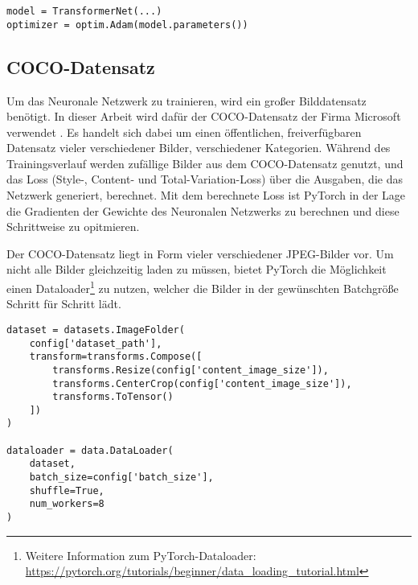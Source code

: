 \begin{listing}[ht]
\begin{verbatim}
model = TransformerNet(...)
optimizer = optim.Adam(model.parameters())
\end{verbatim}
\end{listing}

\subsection{COCO-Datensatz}

Um das Neuronale Netzwerk zu trainieren, wird ein großer Bilddatensatz benötigt. In dieser Arbeit wird dafür der COCO-Datensatz der Firma Microsoft verwendet \cite{DBLP:journals/corr/LinMBHPRDZ14}. Es handelt sich dabei um einen öffentlichen, freiverfügbaren Datensatz vieler verschiedener Bilder, verschiedener Kategorien. Während des Trainingsverlauf werden zufällige Bilder aus dem COCO-Datensatz genutzt, 
und das Loss  (Style-, Content- und Total-Variation-Loss) über die Ausgaben, die das Netzwerk generiert, berechnet.
Mit dem berechnete Loss ist PyTorch in der Lage die Gradienten der Gewichte des Neuronalen Netzwerks zu berechnen und diese 
Schrittweise zu opitmieren.

Der COCO-Datensatz liegt in Form vieler verschiedener JPEG-Bilder vor. 
Um nicht alle Bilder gleichzeitig laden zu müssen, bietet PyTorch die Möglichkeit einen Dataloader\footnote{Weitere Information zum PyTorch-Dataloader: \url{https://pytorch.org/tutorials/beginner/data_loading_tutorial.html}}
zu nutzen, welcher die Bilder in der gewünschten Batchgröße Schritt für Schritt lädt.

\pagebreak

\begin{listing}[ht]
\begin{verbatim}
dataset = datasets.ImageFolder(
    config['dataset_path'],
    transform=transforms.Compose([
        transforms.Resize(config['content_image_size']),
        transforms.CenterCrop(config['content_image_size']),
        transforms.ToTensor()
    ])
)

dataloader = data.DataLoader(
    dataset, 
    batch_size=config['batch_size'],
    shuffle=True, 
    num_workers=8
)
\end{verbatim}
\end{listing}

